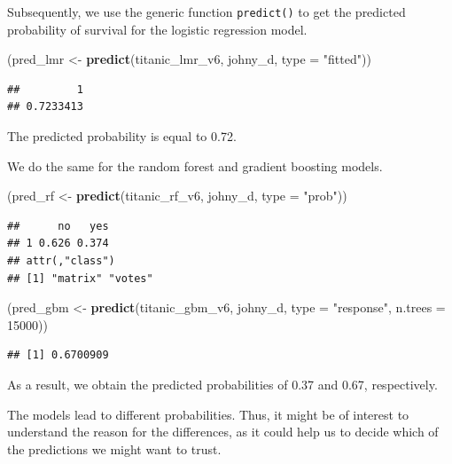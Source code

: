 \documentclass[12pt,]{krantz}
\newenvironment{Shaded}{\begin{snugshade}}{\end{snugshade}}
\newcommand{\DataTypeTok}[1]{\textcolor[rgb]{0.13,0.29,0.53}{#1}}
\newcommand{\DecValTok}[1]{\textcolor[rgb]{0.00,0.00,0.81}{#1}}
\newcommand{\KeywordTok}[1]{\textcolor[rgb]{0.13,0.29,0.53}{\textbf{#1}}}
\newcommand{\NormalTok}[1]{#1}
\newcommand{\StringTok}[1]{\textcolor[rgb]{0.31,0.60,0.02}{#1}}
\theoremstyle{definition}
\theoremstyle{definition}
\theoremstyle{definition}
\theoremstyle{remark}
\begin{document}
Subsequently, we use the generic function \texttt{predict()} to get the
predicted probability of survival for the logistic regression model.

\begin{Shaded}
\begin{Highlighting}[]
\NormalTok{(pred_lmr <-}\StringTok{ }\KeywordTok{predict}\NormalTok{(titanic_lmr_v6, johny_d, }\DataTypeTok{type =} \StringTok{"fitted"}\NormalTok{))}
\end{Highlighting}
\end{Shaded}

\begin{verbatim}
##         1 
## 0.7233413
\end{verbatim}

The predicted probability is equal to 0.72.

We do the same for the random forest and gradient boosting models.

\begin{Shaded}
\begin{Highlighting}[]
\NormalTok{(pred_rf <-}\StringTok{ }\KeywordTok{predict}\NormalTok{(titanic_rf_v6, johny_d, }\DataTypeTok{type =} \StringTok{"prob"}\NormalTok{))}
\end{Highlighting}
\end{Shaded}

\begin{verbatim}
##      no   yes
## 1 0.626 0.374
## attr(,"class")
## [1] "matrix" "votes"
\end{verbatim}

\begin{Shaded}
\begin{Highlighting}[]
\NormalTok{(pred_gbm <-}\StringTok{ }\KeywordTok{predict}\NormalTok{(titanic_gbm_v6, johny_d, }\DataTypeTok{type =} \StringTok{"response"}\NormalTok{, }\DataTypeTok{n.trees =} \DecValTok{15000}\NormalTok{))}
\end{Highlighting}
\end{Shaded}

\begin{verbatim}
## [1] 0.6700909
\end{verbatim}

As a result, we obtain the predicted probabilities of 0.37 and 0.67,
respectively.

The models lead to different probabilities. Thus, it might be of
interest to understand the reason for the differences, as it could help
us to decide which of the predictions we might want to trust.
\end{document}
